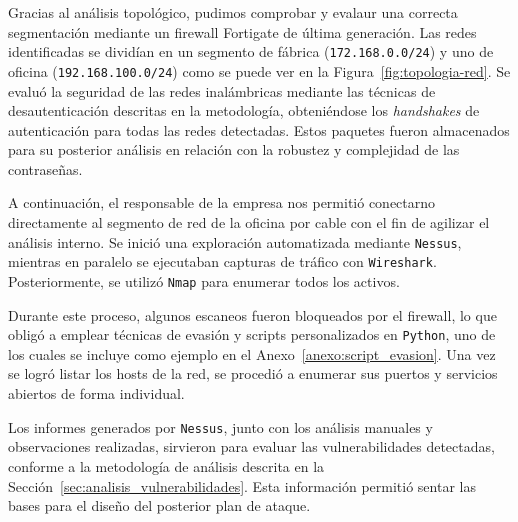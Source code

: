 \documentclass[a4paper, 11pt]{article}
\begin{document}
\par\vspace{0.5cm}

Gracias al análisis topológico, pudimos comprobar y evalaur una correcta segmentación mediante un firewall Fortigate de última generación. Las redes identificadas se dividían en un segmento de fábrica (\texttt{172.168.0.0/24}) y uno de oficina (\texttt{192.168.100.0/24}) como se puede ver en la Figura~\ref{fig:topologia-red}. Se evaluó la seguridad de las redes inalámbricas mediante las técnicas de desautenticación descritas en la metodología, obteniéndose los \textit{handshakes} de autenticación para todas las redes detectadas. Estos paquetes fueron almacenados para su posterior análisis en relación con la robustez y complejidad de las contraseñas.

\par\vspace{0.5cm}

A continuación, el responsable de la empresa nos permitió conectarno directamente al segmento de red de la oficina por cable con el fin de agilizar el análisis interno. Se inició una exploración automatizada mediante \texttt{Nessus}, mientras en paralelo se ejecutaban capturas de tráfico con \texttt{Wireshark}. Posteriormente, se utilizó \texttt{Nmap} para enumerar todos los activos.

\par\vspace{0.5cm}

Durante este proceso, algunos escaneos fueron bloqueados por el firewall, lo que obligó a emplear técnicas de evasión y scripts personalizados en \texttt{Python}, uno de los cuales se incluye como ejemplo en el Anexo~\ref{anexo:script_evasion}. Una vez se logró listar los hosts de la red, se procedió a enumerar sus puertos y servicios abiertos de forma individual.

\par\vspace{0.5cm}

Los informes generados por \texttt{Nessus}, junto con los análisis manuales y observaciones realizadas, sirvieron para evaluar las vulnerabilidades detectadas, conforme a la metodología de análisis descrita en la Sección~\ref{sec:analisis_vulnerabilidades}. Esta información permitió sentar las bases para el diseño del posterior plan de ataque.

\par\vspace{0.5cm}
\end{document}
